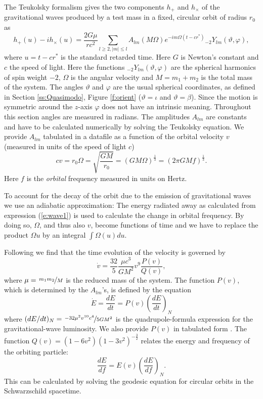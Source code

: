 The Teukolsky formalism gives the two components $h_+$ and $h_\times$ of the
gravitational waves produced by a test mass in a fixed, circular orbit of radius $r_0$
 as
\begin{equation}
  h_+(u) - i h_\times(u) = \frac{2 G \mu}{r c^2} \sum_{l\geq 2, |m| \leq l}
            A_{lm}(M \Omega) e^{-i m \Omega (t - c r^*)} {}_{-2}Y_{lm}(\vartheta,
                        \varphi),
        \label{e:wave1}
\end{equation}
where  $u=t-c r^*$ is the standard retarded time. Here $G$ is Newton's constant and
$c$ the speed of light.
Here the functions ${}_{-2}Y_{lm}(\vartheta,\varphi)$ are the spherical harmonics
of spin weight $-2$, $\Omega$ is the angular velocity and $M=m_1+m_2$ is the
total mass of the system. 
The angles $\vartheta$ and $\varphi$ are the usual spherical coordinates, as defined in
Section \ref{ss:Quasimodo}, Figure \ref{f:orient} ($\vartheta = \iota$ and $\vartheta = \beta$). Since the
motion is symmetric around the $z$-axis $\varphi$ does not have an intrinsic meaning.
Throughout this section angles are measured in radians.
The amplitudes $A_{lm}$ are constants and have to be
calculated numerically by solving the Teukolsky equation.
We provide $A_{lm}$ tabulated in a datafile \cite{ericsfiles} as a function of
the orbital velocity $v$ (measured in units of the speed of light $c$)
\begin{equation}
  c v = r_0 \Omega = \sqrt{\frac{G M}{r_0}} = (G M \Omega )^\frac{1}{3} 
  = (2 \pi G M f)^{\frac{1}{3}}.
\end{equation}
Here $f$ is the {\em orbital} frequency measured in units on Hertz. 

To account for the decay of the orbit due to the emission of gravitational waves
we use an adiabatic approximation: The energy radiated away as calculated from
expression  (\ref{e:wave1}) is used to calculate the change in 
orbital frequency.
By doing so, $\Omega$, and thus also $v$, become functions of time and we
have to replace the product $\Omega u$ by an integral 
$\int \Omega(u) du$.

Following \cite{droz97} we find that the time evolution of the velocity is 
governed by 
\begin{equation}
  \dot{v} = \frac{32}{5} \frac{\mu c^3}{G M^2} v^9 \frac{P(v)}{Q(v)}, 
  \label{e:vdot}
\end{equation}
where $\mu = \nicefrac{m_1 m_2}{M}$  is the reduced mass of the system.
The function $P(v)$, which is determined by the $A_{lm}$'s,  is defined 
by
the equation
\[
  \dot{E} = \frac{dE}{dt} = P(v) \left(\frac{dE}{dt}\right)_N
\]
where $(dE/dt)_N = \nicefrac{-32 \mu^2 v^{10} c^4}{5 G M^2}$ is the  quadrupole-formula
expression for the gravitational-wave luminosity.
We also provide $P(v)$ in tabulated form \cite{ericsfiles}. The function $Q(v) =
(1-6v^2)(1-3v^2)^{-\frac{3}{2}}$ relates the energy and frequency of the
orbiting particle:
\[
   \frac{dE}{df} = E(v) \left(\frac{dE}{df}\right)_N.
\]
This can be calculated by solving the geodesic equation for
circular orbits in the Schwarzschild spacetime.

